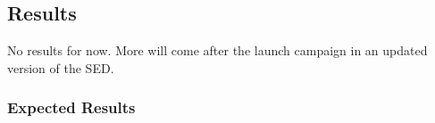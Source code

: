 \subsection{Results}

No results for now. More will come after the launch campaign in an updated version of the SED. 

\subsubsection{Expected Results}
\label{sec:ExpecterResults}


